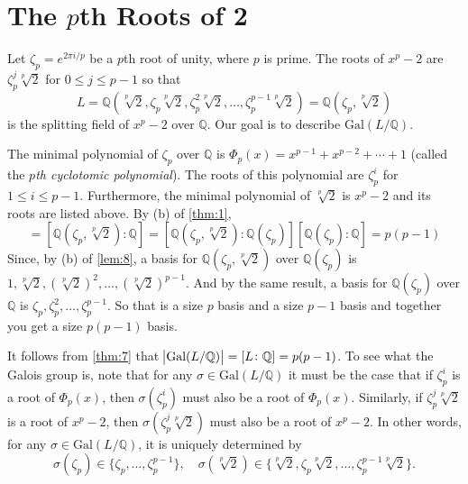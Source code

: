 \documentclass[leqno]{article}
\newcommand{\g}[1]{\text{Gal}(#1)}
\theoremstyle{definition}
\theoremstyle{remark}
\theoremstyle{definition}
\begin{document}
\section{The $p$th Roots of 2}
    Let $\zeta_p=e^{2\pi i/p}$ be a $p$th root of unity, where $p$ is prime. The roots of $x^p-2$ are $\zeta_p^j\sqrt[p]{2}$ for $0\leq j\leq p-1$ so that 
        \begin{equation*}
            L=\mathbb{Q}(\sqrt[p]{2},\zeta_p\sqrt[p]{2},\zeta_p^2\sqrt[p]{2},\dots,\zeta_p^{p-1}\sqrt[p]{2})=\mathbb{Q}(\zeta_p,\sqrt[p]{2})
        \end{equation*}
    is the splitting field of $x^p-2$ over $\mathbb{Q}$. Our goal is to describe $\g{L/\mathbb{Q}}$. \par\hspace{4mm} The minimal polynomial of $\zeta_p$ over $\mathbb{Q}$ is $\Phi_p(x)=x^{p-1}+x^{p-2}+\cdots+1$ (called the \emph{$p$th cyclotomic polynomial}). The roots of this polynomial are $\zeta_p^i$ for $1\leq i\leq p-1$. Furthermore, the minimal polynomial of $\sqrt[p]{2}$ is $x^p-2$ and its roots are listed above. By (b) of \cref{thm:1}, 
        \begin{equation*}
            [L\colon \mathbb{Q}]=[\mathbb{Q}(\zeta_p,\sqrt[p]{2})\colon\mathbb{Q}]=[\mathbb{Q}(\zeta_p,\sqrt[p]{2})\colon\mathbb{Q}(\zeta_p)][\mathbb{Q}(\zeta_p)\colon\mathbb{Q}]=p(p-1)
        \end{equation*}
    Since, by (b) of \cref{lem:8}, a basis for $\mathbb{Q}(\zeta_p,\sqrt[p]{2})$ over $\mathbb{Q}(\zeta_p)$ is $1,\sqrt[p]{2},(\sqrt[p]{2})^2,\dots,(\sqrt[p]{2})^{p-1}$. And by the same result, a basis for $\mathbb{Q}(\zeta_p)$ over $\mathbb{Q}$ is $\zeta_p,\zeta_p^2,\dots,\zeta_p^{p-1}$. So that is a size $p$ basis and a size $p-1$ basis and together you get a size $p(p-1)$ basis. \par\hspace{4mm} It follows from \cref{thm:7} that $\abs{\g{L/\mathbb{Q}}}=[L\colon\mathbb{Q}]=p(p-1)$. To see what the Galois group is, note that for any $\sigma\in\g{L/\mathbb{Q}}$ it must be the case that if $\zeta_p^i$ is a root of $\Phi_p(x)$, then $\sigma(\zeta_p^i)$ must also be a root of $\Phi_p(x)$. Similarly, if $\zeta_p^j\sqrt[p]{2}$ is a root of $x^p-2$, then $\sigma(\zeta_p^j\sqrt[p]{2})$ must also be a root of $x^p-2$. In other words, for any $\sigma\in\g{L/\mathbb{Q}}$, it is uniquely determined by
        \begin{equation*}
            \sigma(\zeta_p)\in\{\zeta_p,\dots,\zeta_p^{p-1}\},\quad\sigma(\sqrt[p]{2})\in\{\sqrt[p]{2},\zeta_p\sqrt[p]{2},\dots,\zeta_p^{p-1}\sqrt[p]{2}\}.
        \end{equation*}
\end{document}
